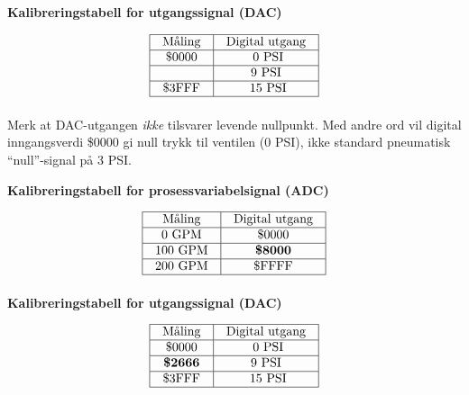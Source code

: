 \vskip 10pt

\noindent
{\bf Kalibreringstabell for utgangssignal (DAC)}


$$\vbox{\offinterlineskip
\halign{\strut
\vrule \quad\hfil # \ \hfil & 
\vrule \quad\hfil # \ \hfil \vrule \cr
\noalign{\hrule}
%
Måling & Digital utgang \cr
%
\noalign{\hrule}
%
\$0000 & 0 PSI\cr
%
\noalign{\hrule}
%
 & 9 PSI \cr
%
\noalign{\hrule}
%
\$3FFF & 15 PSI\cr
%
\noalign{\hrule}
} %
}$$ %

\vskip 10pt

Merk at DAC-utgangen {\it ikke} tilsvarer levende nullpunkt. Med andre ord vil digital inngangsverdi \$0000 gi null trykk til ventilen (0 PSI), ikke standard pneumatisk ``null''-signal på 3 PSI.







\noindent
{\bf Kalibreringstabell for prosessvariabelsignal (ADC)}


$$\vbox{\offinterlineskip
\halign{\strut
\vrule \quad\hfil # \ \hfil & 
\vrule \quad\hfil # \ \hfil \vrule \cr
\noalign{\hrule}
%
Måling & Digital utgang \cr
%
\noalign{\hrule}
%
0 GPM & \$0000 \cr
%
\noalign{\hrule}
%
100 GPM & {\bf \$8000} \cr
%
\noalign{\hrule}
%
200 GPM & \$FFFF \cr
%
\noalign{\hrule}
} %
}$$ %

\vskip 10pt

\noindent
{\bf Kalibreringstabell for utgangssignal (DAC)}


$$\vbox{\offinterlineskip
\halign{\strut
\vrule \quad\hfil # \ \hfil & 
\vrule \quad\hfil # \ \hfil \vrule \cr
\noalign{\hrule}
%
Måling & Digital utgang \cr
%
\noalign{\hrule}
%
\$0000 & 0 PSI\cr
%
\noalign{\hrule}
%
{\bf \$2666} & 9 PSI \cr
%
\noalign{\hrule}
%
\$3FFF & 15 PSI\cr
%
\noalign{\hrule}
} %
}$$ %


